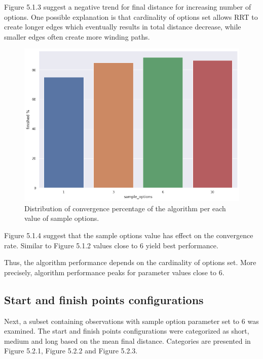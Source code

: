 \documentclass[12pt]{article}
\DeclareRobustCommand{\[}{\begin{equation}}
\DeclareRobustCommand{\]}{\end{equation}}
\numberwithin{equation}{section}
\begin{document}
Figure 5.1.3 suggest a negative trend for final distance for increasing number of options. One possible explanation is that cardinality of options set allows RRT to create longer edges which eventually results in total distance decrease, while smaller edges often create more winding paths.

\begin{figure}[H]
\begin{center}
\includegraphics[scale=0.4]{images/so_finished.png}
\captionsetup{width=0.6\textwidth}
\caption{Distribution of convergence percentage of the algorithm per each value of sample options.}
\end{center}
\end{figure}

Figure 5.1.4 suggest that the sample options value has effect on the convergence rate. Similar to Figure 5.1.2 values close to 6 yield best performance.

Thus, the algorithm performance depends on the cardinality of options set. More precisely, algorithm performance peaks for parameter values close to 6.

\subsection{Start and finish points configurations}

Next, a subset containing observations with sample option parameter set to 6 was examined. The start and finish points configurations were categorized as short, medium and long based on the mean final distance. Categories are presented in Figure 5.2.1, Figure 5.2.2 and Figure 5.2.3.
\end{document}
